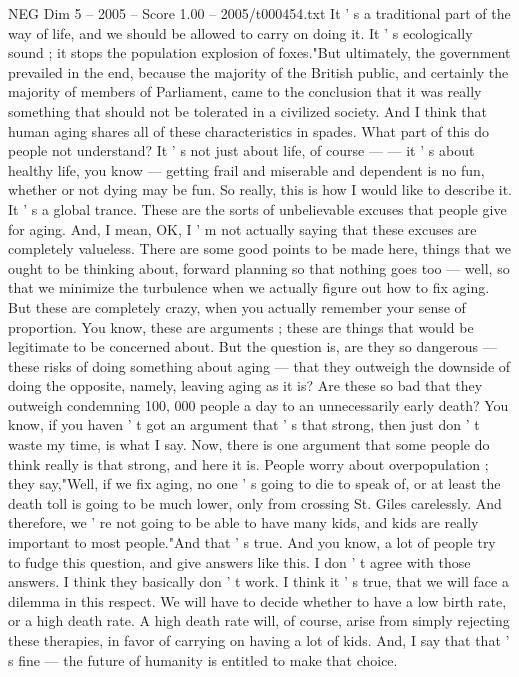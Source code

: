 \begin{textsample}{NEG Dim 5 – 2005 – Score 1.00 – 2005/t000454.txt}
It ' s a traditional part of the way of life, and we should be allowed to carry on doing it.
It ' s ecologically sound ; it stops the population explosion of foxes."But ultimately, the government prevailed in the end, because the majority of the British public, and certainly the majority of members of Parliament, came to the conclusion that it was really something that should not be tolerated in a civilized society.
And I think that human aging shares all of these characteristics in spades.
What part of this do people not understand?
It ' s not just about life, of course — — it ' s about healthy life, you know — getting frail and miserable and dependent is no fun, whether or not dying may be fun.
So really, this is how I would like to describe it.
It ' s a global trance.
These are the sorts of unbelievable excuses that people give for aging.
And, I mean, OK, I ' m not actually saying that these excuses are completely valueless.
There are some good points to be made here, things that we ought to be thinking about, forward planning so that nothing goes too — well, so that we minimize the turbulence when we actually figure out how to fix aging.
But these are completely crazy, when you actually remember your sense of proportion.
You know, these are arguments ; these are things that would be legitimate to be concerned about.
But the question is, are they so dangerous — these risks of doing something about aging — that they outweigh the downside of doing the opposite, namely, leaving aging as it is?
Are these so bad that they outweigh condemning 100, 000 people a day to an unnecessarily early death?
You know, if you haven ' t got an argument that ' s that strong, then just don ' t waste my time, is what I say.
Now, there is one argument that some people do think really is that strong, and here it is.
People worry about overpopulation ; they say,"Well, if we fix aging, no one ' s going to die to speak of, or at least the death toll is going to be much lower, only from crossing St.
Giles carelessly.
And therefore, we ' re not going to be able to have many kids, and kids are really important to most people."And that ' s true.
And you know, a lot of people try to fudge this question, and give answers like this.
I don ' t agree with those answers.
I think they basically don ' t work.
I think it ' s true, that we will face a dilemma in this respect.
We will have to decide whether to have a low birth rate, or a high death rate.
A high death rate will, of course, arise from simply rejecting these therapies, in favor of carrying on having a lot of kids.
And, I say that that ' s fine — the future of humanity is entitled to make that choice.

\end{textsample}
